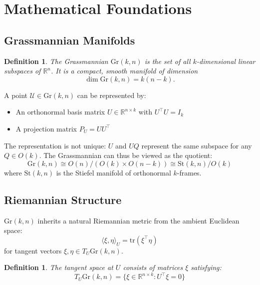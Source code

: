 \documentclass[11pt,a4paper]{article}
\newtheorem{definition}[theorem]{Definition}
\newcommand{\Gr}{\mathrm{Gr}}
\newcommand{\R}{\mathbb{R}}
\newcommand{\tr}{\mathrm{tr}}
\newcommand{\inner}[2]{\langle #1, #2 \rangle}
\begin{document}
\section{Mathematical Foundations}
\label{sec:foundations}

\subsection{Grassmannian Manifolds}

\begin{definition}
The \emph{Grassmannian} $\Gr(k,n)$ is the set of all $k$-dimensional linear subspaces of $\R^n$. It is a compact, smooth manifold of dimension
\begin{equation}
    \dim \Gr(k,n) = k(n-k).
\end{equation}
\end{definition}

A point $\mathcal{U} \in \Gr(k,n)$ can be represented by:
\begin{itemize}
    \item An orthonormal basis matrix $U \in \R^{n \times k}$ with $U^\top U = I_k$
    \item A projection matrix $P_U = UU^\top$
\end{itemize}

The representation is not unique: $U$ and $UQ$ represent the same subspace for any $Q \in O(k)$. The Grassmannian can thus be viewed as the quotient:
\begin{equation}
    \Gr(k,n) \cong O(n)/(O(k) \times O(n-k)) \cong \mathrm{St}(k,n)/O(k)
\end{equation}
where $\mathrm{St}(k,n)$ is the Stiefel manifold of orthonormal $k$-frames.

\subsection{Riemannian Structure}

$\Gr(k,n)$ inherits a natural Riemannian metric from the ambient Euclidean space:
\begin{equation}
    \inner{\xi}{\eta}_U = \tr(\xi^\top \eta)
\end{equation}
for tangent vectors $\xi, \eta \in T_U \Gr(k,n)$.

\begin{definition}
The \emph{tangent space} at $U$ consists of matrices $\xi$ satisfying:
\begin{equation}
    T_U \Gr(k,n) = \{\xi \in \R^{n \times k} : U^\top \xi = 0\}
\end{equation}
\end{definition}
\end{document}
